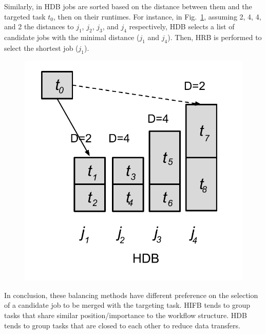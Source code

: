 Similarly, in HDB jobs are sorted based on the distance between them and the targeted task $t_0$, then on their runtimes. For instance, in Fig.~\ref{fig:imbalance_hdb}, assuming 2, 4, 4, and 2 the distances to $j_1$, $j_2$, $j_3$, and $j_4$ respectively, HDB selects a list of candidate jobs with the minimal distance ($j_1$ and $j_4$). Then, HRB is performed to select the shortest job ($j_1$). 

\begin{figure}[htb]
	\centering
	\includegraphics[width=0.5\linewidth]{figures/imbalance/algorithm_hdb.pdf}
	\label{fig:imbalance_hdb}
\end{figure}

In conclusion, these balancing methods have different preference on the selection of a candidate job to be merged with the targeting task. HIFB tends to group tasks that share similar position/importance to the workflow structure. HDB tends to group tasks that are closed to each other to reduce data transfers. 




